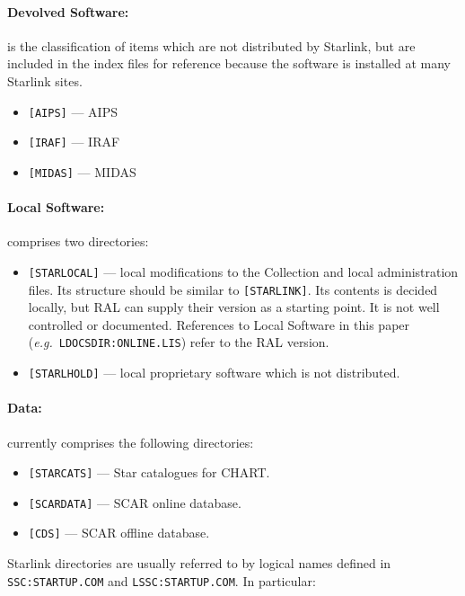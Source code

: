 \paragraph{Devolved Software:} is the classification of items which are not
distributed by Starlink, but are included in the index files for reference
because the software is installed at many Starlink sites.

\begin{itemize}
\item {\tt [AIPS]} --- AIPS
\item {\tt [IRAF]} --- IRAF
\item {\tt [MIDAS]} --- MIDAS
\end{itemize}

\paragraph{Local Software:} comprises two directories:

\begin{itemize}

\item {\tt [STARLOCAL]} --- local modifications to the Collection and local
administration files. Its structure should be similar to {\tt [STARLINK]}. Its
contents is decided locally, but RAL can supply their version as a starting
point. It is not well controlled or documented. References to Local Software in
this paper ({\em e.g.}\ {\tt LDOCSDIR:ONLINE.LIS}) refer to the RAL version.

\item {\tt [STARLHOLD]} --- local proprietary software which is not distributed.
\end{itemize}

\paragraph{Data:} currently comprises the following directories:

\begin{itemize}
\item {\tt [STARCATS]} --- Star catalogues for CHART.
\item {\tt [SCARDATA]} --- SCAR online database.
\item {\tt [CDS]} --- SCAR offline database.
\end{itemize}

Starlink directories are usually referred to by logical names defined in
{\tt SSC:STARTUP.COM} and {\tt LSSC:\-STARTUP.\-COM}. In particular:

